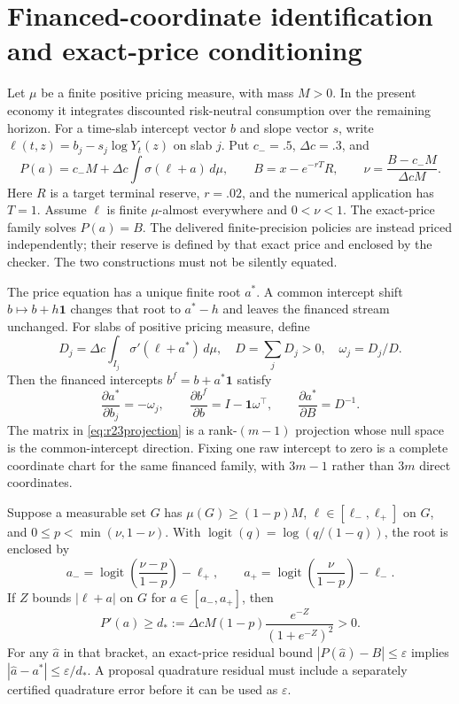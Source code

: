 \section{Financed-coordinate identification and exact-price conditioning}\label{sec:r23method}
Let $\mu$ be a finite positive pricing measure, with mass $M>0$. In the present economy it integrates discounted risk-neutral consumption over the remaining horizon. For a time-slab intercept vector $b$ and slope vector $s$, write $\ell(t,z)=b_j-s_j\log Y_t(z)$ on slab $j$. Put $c_-=.5$, $\Delta c=.3$, and
\[
 P(a)=c_-M+\Delta c\int\sigma(\ell+a)\,d\mu,
 \qquad B=x-e^{-rT}R,
 \qquad \nu=\frac{B-c_-M}{\Delta c M}.
\]
Here $R$ is a target terminal reserve, $r=.02$, and the numerical application has $T=1$. Assume $\ell$ is finite $\mu$-almost everywhere and $0<\nu<1$. The exact-price family solves $P(a)=B$. The delivered finite-precision policies are instead priced independently; their reserve is defined by that exact price and enclosed by the checker. The two constructions must not be silently equated.

\begin{theorem}\label{thm:r23budget}
The price equation has a unique finite root $a^*$. A common intercept shift $b\mapsto b+h\mathbf1$ changes that root to $a^*-h$ and leaves the financed stream unchanged. For slabs of positive pricing measure, define
\[
 D_j=\Delta c\int_{I_j}\sigma'(\ell+a^*)\,d\mu,
 \quad D=\sum_jD_j>0,\quad\omega_j=D_j/D.
\]
Then the financed intercepts $b^f=b+a^*\mathbf1$ satisfy
\begin{equation}
 \frac{\partial a^*}{\partial b_j}=-\omega_j,
 \qquad \frac{\partial b^f}{\partial b}=I-\mathbf1\omega^\top,
 \qquad \frac{\partial a^*}{\partial B}=D^{-1}.
 \label{eq:r23projection}
\end{equation}
The matrix in \eqref{eq:r23projection} is a rank-$(m-1)$ projection whose null space is the common-intercept direction. Fixing one raw intercept to zero is a complete coordinate chart for the same financed family, with $3m-1$ rather than $3m$ direct coordinates.

Suppose a measurable set $G$ has $\mu(G)\geq(1-p)M$, $\ell\in[\ell_-,\ell_+]$ on $G$, and $0\leq p<\min(\nu,1-\nu)$. With $\operatorname{logit}(q)=\log(q/(1-q))$, the root is enclosed by
\begin{equation}
 a_- =\operatorname{logit}\!\left(\frac{\nu-p}{1-p}\right)-\ell_+,
 \qquad
 a_+ =\operatorname{logit}\!\left(\frac{\nu}{1-p}\right)-\ell_-.
 \label{eq:r23bracket}
\end{equation}
If $Z$ bounds $|\ell+a|$ on $G$ for $a\in[a_-,a_+]$, then
\begin{equation}
 P'(a)\geq d_*:=\Delta c M(1-p)\frac{e^{-Z}}{(1+e^{-Z})^2}>0.
 \label{eq:r23conditioning}
\end{equation}
For any $\widehat a$ in that bracket, an exact-price residual bound $|P(\widehat a)-B|\leq\varepsilon$ implies $|\widehat a-a^*|\leq\varepsilon/d_*$. A proposal quadrature residual must include a separately certified quadrature error before it can be used as $\varepsilon$.
\end{theorem}

